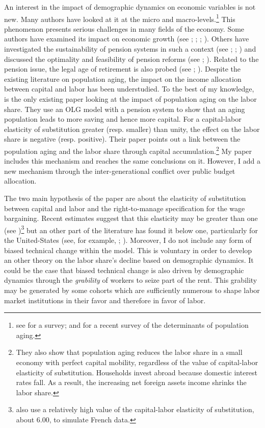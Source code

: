 An interest in the impact of demographic dynamics on economic variables is not new. Many authors have looked at it at the micro and macro-levels.\footnote{see \cite{Clark1978} for a survey; and \cite{Bloom2016} for a recent survey of the determinants of population aging.} 
This phenomenon presents serious challenges in many fields of the economy. Some authors have examined its impact on economic growth (see \citealt{VanGroezen2005}; \citealt{Soares2005}; \citealt{Bloom2010}; \citealt{Lee2010}). Others have investigated the sustainability of pension systems in such a context (see \citealt{Ono2003}; \citealt{DelaCroix2013}; \citealt{Philipov2014}) and discussed the optimality and feasibility of pension reforms (see \citealt{Pecchenino1997}; \citealt{Sinn2003}). Related to the pension issue, the legal age of retirement is also probed (see \citealt{Futagami2001}; \citealt{Dedry2017}). Despite the existing literature on population aging, the impact on the income allocation between capital and labor has been understudied. To the best of my knowledge, \cite{Schmidt2013} is the only existing paper looking at the impact of population aging on the labor share. They use an OLG model with a pension system to show that an aging population leads to more saving and hence more capital. For a capital-labor elasticity of substitution greater (resp. smaller) than unity, the effect on the labor share is negative (resp. positive). Their paper points out a link between the population aging and the labor share through capital accumulation.\footnote{They also show that population aging reduces the labor share in a small economy with perfect capital mobility, regardless of the value of capital-labor elasticity of substitution. Households invest abroad because domestic interest rates fall. As a result, the increasing net foreign assets income shrinks the labor share.} My paper includes this mechanism and reaches the same conclusions on it. However, I add a new mechanism through the inter-generational conflict over public budget allocation.



The two main hypothesis of the paper are about the elasticity of substitution between capital and labor and the right-to-manage specification for the wage bargaining. Recent estimates suggest that this elasticity may be greater than one (see \citealt{Karabarbounis2014})\footnote{\cite{Caballero1998} also use a relatively high value of the capital-labor elasticity of substitution, about 6.00, to simulate French data.} but an other part of the literature has found it below one, particularly for the United-States (see, for example, \citealt{Antras2004}; \citealt{Chirinko2008}). 
Moreover, I do not include any form of biased technical change within the model. This is voluntary in order to develop an other theory on the labor share's decline based on demographic dynamics. It could be the case that biased technical change is also driven by demographic dynamics through the \textit{grability} of workers to seize part of the rent. This grability may be generated by some cohorts which are sufficiently numerous to shape labor market institutions in their favor and therefore in favor of labor.

